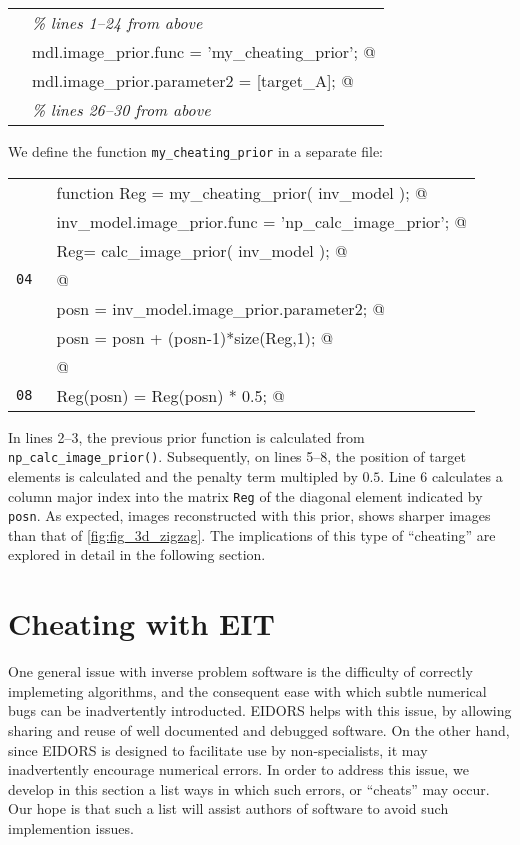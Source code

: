 \documentclass[12pt]{iopart}
\makeatletter
\newcommand{\CN}{\tt\small} %
\newcommand{\CC}{&\verb@}   % start code
\newcommand{\CI}{&\it}   % start code
\makeatother
\begin{document}
\begin{tabular}{ll}
\CN    \CI \% lines 1--24 from above \\
\CN    \CC mdl.image_prior.func       = 'my_cheating_prior'; @\\
\CN    \CC mdl.image_prior.parameter2 = [target_A]; @\\
\CN    \CI \% lines 26--30 from above \\
\end{tabular}

We define the function {\tt my\_cheating\_prior} in a separate file:

\begin{tabular}{ll}
\CN    \CC function Reg = my_cheating_prior( inv_model ); @\\
\CN    \CC   inv_model.image_prior.func = 'np_calc_image_prior'; @\\
\CN    \CC   Reg= calc_image_prior( inv_model ); @\\
\CN 04 \CC @\\
\CN    \CC   posn = inv_model.image_prior.parameter2; @\\
\CN    \CC   posn = posn + (posn-1)*size(Reg,1); @\\
\CN    \CC @\\
\CN 08 \CC   Reg(posn) = Reg(posn) * 0.5; @\\
\end{tabular}

In lines 2--3, the previous prior function is calculated
from {\tt np\_calc\_image\_prior()}. Subsequently, on lines
5--8, the position of target elements is calculated and
the penalty term multipled by $0.5$. Line 6 calculates
a column major index into the matrix {\tt Reg} of the
diagonal element indicated by {\tt posn}. As expected,
images reconstructed with this prior, shows sharper
images than that of \ref{fig:fig_3d_zigzag}.
The implications of this type of ``cheating'' are explored
in detail in the following section.



\section{
 Cheating with EIT
}

One general issue with inverse problem software is the difficulty
of correctly implemeting algorithms, and the consequent ease with
which subtle numerical bugs can be inadvertently introducted.
EIDORS helps with this issue, by allowing sharing and reuse
of well documented and debugged software. On the other hand, 
since EIDORS is designed to facilitate use by non-specialists,
it may inadvertently encourage numerical errors.
In order to address this issue, we develop in this section
a list ways in which such errors, or ``cheats'' may occur.
Our hope is that such a list will assist authors of software
to avoid such implemention issues.
\end{document}
